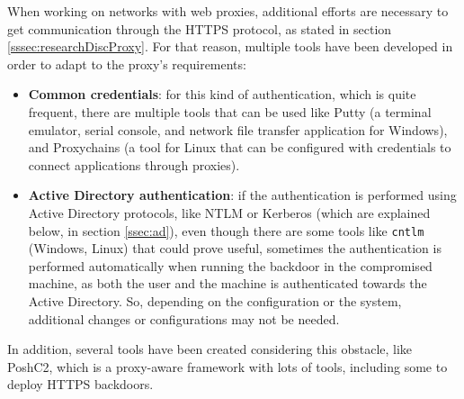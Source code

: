 \begin{itemize}
When working on networks with web proxies, additional efforts are necessary to get communication through the HTTPS protocol, as stated in section \ref{sssec:researchDiscProxy}. For that reason, multiple tools have been developed in order to adapt to the proxy's requirements:
\begin{itemize}
\item \textbf{Common credentials}: for this kind of authentication,  which is quite frequent, there are multiple tools that can be used like Putty\cite{PuttyWeb} (a terminal emulator, serial console, and network file transfer application for Windows), and Proxychains\cite{ProxyChainsWeb} (a tool for Linux that can be configured with credentials to connect applications through proxies).  


\item \textbf{Active Directory authentication}: if the authentication is performed using Active Directory protocols, like NTLM or Kerberos (which are explained below, in section \ref{ssec:ad}), even though there are some tools like \texttt{cntlm} (Windows, Linux) that could prove useful, sometimes the authentication is performed automatically when running the backdoor in the compromised machine, as both the user and the machine is authenticated towards the Active Directory. So, depending on the configuration or the system, additional changes or configurations may not be needed.
\end{itemize}

In addition, several tools have been created considering this obstacle, like PoshC2\cite{PoshC2}, which is a proxy-aware framework with lots of tools, including some to deploy HTTPS backdoors.

\end{itemize}